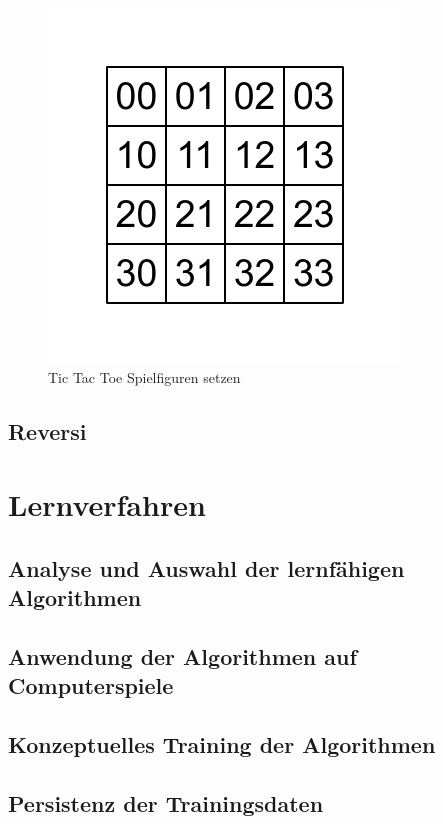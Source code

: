 \begin{figure}[!htbp]
  \centering
  \includegraphics[scale = 1]{inhalt/abbildungen/vier_mal_vier_matrix.pdf}
  \caption{Tic Tac Toe Spielfiguren setzen}
  \label{fig:kreiseUndKreuzeSetzen}
\end{figure}

\subsection{Reversi}

\section{Lernverfahren}
\label{sec:lernverfahren}

\subsection{Analyse und Auswahl der lernfähigen Algorithmen}

\subsection{Anwendung der Algorithmen auf Computerspiele}

\subsection{Konzeptuelles Training der Algorithmen}

\subsection{Persistenz der Trainingsdaten}